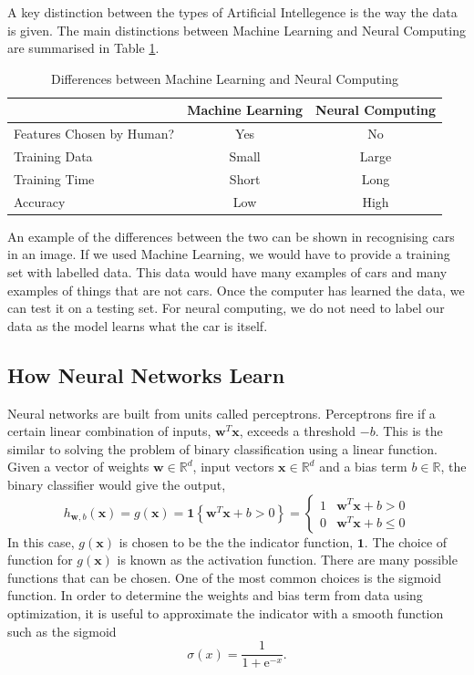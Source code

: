 \documentclass[a4paper,11pt]{article}
\theoremstyle{plain} %
\theoremstyle{definition} %
\theoremstyle{remark} %
\begin{document}
A key distinction between the types of Artificial Intellegence is the way the data is given. The main distinctions between Machine Learning and Neural Computing are summarised in Table \ref{Table1}.
\begin{table}[htb]
    \centering
        \begin{tabular}{ |l | c c|} 
            \hline
             & Machine Learning & Neural Computing \\ 
            \hline
            Features Chosen by Human?         & Yes & No \\ 
            Training Data & Small & Large \\ 
            Training Time       & Short & Long \\ 
            Accuracy      & Low & High \\ 
            \hline
        \end{tabular}%
    \caption{Differences between Machine Learning and Neural Computing}
    \label{Table1}
\end{table}
An example of the differences between the two can be shown in recognising cars in an image. If we used Machine Learning, we would have to provide a training set with labelled data. This data would have many examples of cars and many examples of things that are not cars. Once the computer has learned the data, we can test it on a testing set. For neural computing, we do not need to label our data as the model learns what the car is itself.

\subsection{How Neural Networks Learn}

Neural networks are built from units called perceptrons. Perceptrons fire if a certain linear combination of inputs, $\boldsymbol{w}^T \boldsymbol{x}$, exceeds a threshold $-b$. 
This is the similar to solving the problem of binary classification using a linear function. Given a vector of weights $\boldsymbol{w} \in \mathbb{R}^d$, input vectors $\boldsymbol{x} \in \mathbb{R}^d$ and a bias term $b \in \mathbb{R}$, the binary classifier would give the output,
$$
h_{\boldsymbol{w}, b}(\boldsymbol{x})= g(\boldsymbol{x}) = \mathbf{1}\left\{\boldsymbol{w}^T \boldsymbol{x}+b>0\right\}= \begin{cases}1 & \boldsymbol{w}^T \boldsymbol{x}+b>0 \\ 0 & \boldsymbol{w}^T \boldsymbol{x}+b \leq 0\end{cases}
$$
In this case, $g(\boldsymbol{x})$ is chosen to be the the indicator function, $\mathbf{1}$. The choice of function for $g(\boldsymbol{x})$ is known as the activation function. There are many possible functions that can be chosen. One of the most common choices is the sigmoid function.
In order to determine the weights and bias term from data using optimization, it is useful to approximate the indicator with a smooth function such as the sigmoid
$$
\sigma(x)=\frac{1}{1+\mathrm{e}^{-x}} .
$$
\end{document}
